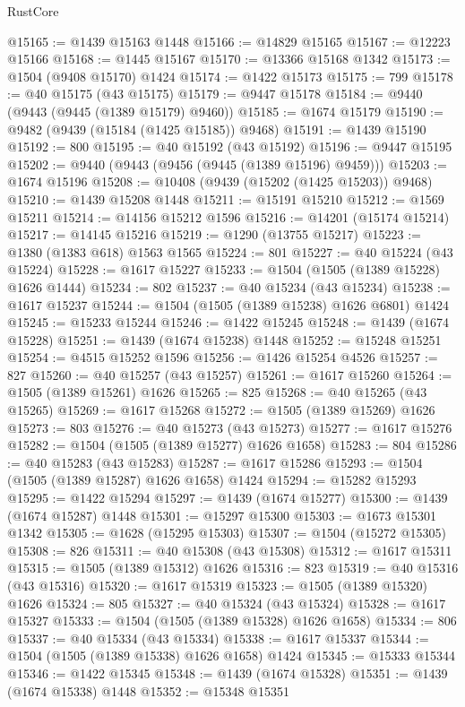 \begin{lexlean}{RustCore}
\begin{coremodule}
@15165 := @1439 @15163 @1448
@15166 := @14829 @15165
@15167 := @12223 @15166
@15168 := @1445 @15167
@15170 := @13366 @15168 @1342
@15173 := @1504 (@9408 @15170) @1424
@15174 := @1422 @15173
@15175 := 799
@15178 := @40 @15175 (@43 @15175)
@15179 := @9447 @15178
@15184 := @9440 (@9443 (@9445 (@1389 @15179) @9460))
@15185 := @1674 @15179
@15190 := @9482 (@9439 (@15184 (@1425 @15185)) @9468)
@15191 := @1439 @15190
@15192 := 800
@15195 := @40 @15192 (@43 @15192)
@15196 := @9447 @15195
@15202 := @9440 (@9443 (@9456 (@9445 (@1389 @15196) @9459)))
@15203 := @1674 @15196
@15208 := @10408 (@9439 (@15202 (@1425 @15203)) @9468)
@15210 := @1439 @15208 @1448
@15211 := @15191 @15210
@15212 := @1569 @15211
@15214 := @14156 @15212 @1596
@15216 := @14201 (@15174 @15214)
@15217 := @14145 @15216
@15219 := @1290 (@13755 @15217)
@15223 := @1380 (@1383 @618) @1563 @1565
@15224 := 801
@15227 := @40 @15224 (@43 @15224)
@15228 := @1617 @15227
@15233 := @1504 (@1505 (@1389 @15228) @1626 @1444)
@15234 := 802
@15237 := @40 @15234 (@43 @15234)
@15238 := @1617 @15237
@15244 := @1504 (@1505 (@1389 @15238) @1626 @6801) @1424
@15245 := @15233 @15244
@15246 := @1422 @15245
@15248 := @1439 (@1674 @15228)
@15251 := @1439 (@1674 @15238) @1448
@15252 := @15248 @15251
@15254 := @4515 @15252 @1596
@15256 := @1426 @15254 @4526
@15257 := 827
@15260 := @40 @15257 (@43 @15257)
@15261 := @1617 @15260
@15264 := @1505 (@1389 @15261) @1626
@15265 := 825
@15268 := @40 @15265 (@43 @15265)
@15269 := @1617 @15268
@15272 := @1505 (@1389 @15269) @1626
@15273 := 803
@15276 := @40 @15273 (@43 @15273)
@15277 := @1617 @15276
@15282 := @1504 (@1505 (@1389 @15277) @1626 @1658)
@15283 := 804
@15286 := @40 @15283 (@43 @15283)
@15287 := @1617 @15286
@15293 := @1504 (@1505 (@1389 @15287) @1626 @1658) @1424
@15294 := @15282 @15293
@15295 := @1422 @15294
@15297 := @1439 (@1674 @15277)
@15300 := @1439 (@1674 @15287) @1448
@15301 := @15297 @15300
@15303 := @1673 @15301 @1342
@15305 := @1628 (@15295 @15303)
@15307 := @1504 (@15272 @15305)
@15308 := 826
@15311 := @40 @15308 (@43 @15308)
@15312 := @1617 @15311
@15315 := @1505 (@1389 @15312) @1626
@15316 := 823
@15319 := @40 @15316 (@43 @15316)
@15320 := @1617 @15319
@15323 := @1505 (@1389 @15320) @1626
@15324 := 805
@15327 := @40 @15324 (@43 @15324)
@15328 := @1617 @15327
@15333 := @1504 (@1505 (@1389 @15328) @1626 @1658)
@15334 := 806
@15337 := @40 @15334 (@43 @15334)
@15338 := @1617 @15337
@15344 := @1504 (@1505 (@1389 @15338) @1626 @1658) @1424
@15345 := @15333 @15344
@15346 := @1422 @15345
@15348 := @1439 (@1674 @15328)
@15351 := @1439 (@1674 @15338) @1448
@15352 := @15348 @15351

\end{coremodule}
\end{lexlean}
